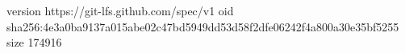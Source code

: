 version https://git-lfs.github.com/spec/v1
oid sha256:4e3a0ba9137a015abe02c47bd5949dd53d58f2dfe06242f4a800a30e35bf5255
size 174916
